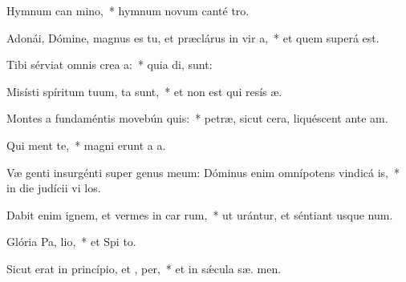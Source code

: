 \item Hymnum can mino,~* hymnum novum canté  tro.
\item Adonái, Dómine, magnus es tu, et præclárus in vir a,~* et quem superá  est.
\item Tibi sérviat omnis crea a:~* quia di,   sunt:
\item Misísti spíritum tuum,  ta sunt,~* et non est qui resís  æ.
\item Montes a fundaméntis movebún  quis:~* petræ, sicut cera, liquéscent ante  am.
\item Qui  ment te,~* magni erunt a   a.
\item Væ genti insurgénti super genus meum: Dóminus enim omnípotens vindicá  is,~* in die judícii vi los.
\item Dabit enim ignem, et vermes in car rum,~* ut urántur, et séntiant usque  num.
\item Glória Pa,  lio,~* et Spi to.
\item Sicut erat in princípio, et ,  per,~* et in sǽcula sæ. men.
